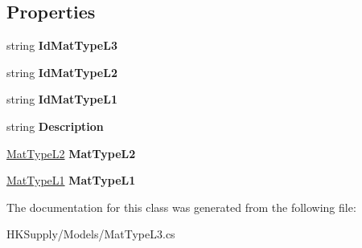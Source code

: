 \subsection*{Properties}
\begin{DoxyCompactItemize}
\item 
\mbox{\label{class_h_k_supply_1_1_models_1_1_mat_type_l3_a6ea18cc97b54d41113cc861b9cbcc039}} 
string {\bfseries Id\+Mat\+Type\+L3}
\item 
\mbox{\label{class_h_k_supply_1_1_models_1_1_mat_type_l3_ad814ef4a9a8167aedd06773fdfc9c9a1}} 
string {\bfseries Id\+Mat\+Type\+L2}
\item 
\mbox{\label{class_h_k_supply_1_1_models_1_1_mat_type_l3_afaf5d4943c9e605847280b09b7c758df}} 
string {\bfseries Id\+Mat\+Type\+L1}
\item 
\mbox{\label{class_h_k_supply_1_1_models_1_1_mat_type_l3_a9bc7a289248732f871a895192e060a88}} 
string {\bfseries Description}
\item 
\mbox{\label{class_h_k_supply_1_1_models_1_1_mat_type_l3_add997f0613b4fc2e195cdc5ca8a2f265}} 
\mbox{\hyperlink{class_h_k_supply_1_1_models_1_1_mat_type_l2}{Mat\+Type\+L2}} {\bfseries Mat\+Type\+L2}
\item 
\mbox{\label{class_h_k_supply_1_1_models_1_1_mat_type_l3_ab44576779d4374443f1ebfa28d952eaf}} 
\mbox{\hyperlink{class_h_k_supply_1_1_models_1_1_mat_type_l1}{Mat\+Type\+L1}} {\bfseries Mat\+Type\+L1}
\end{DoxyCompactItemize}


The documentation for this class was generated from the following file\+:\begin{DoxyCompactItemize}
\item 
H\+K\+Supply/\+Models/Mat\+Type\+L3.\+cs\end{DoxyCompactItemize}
